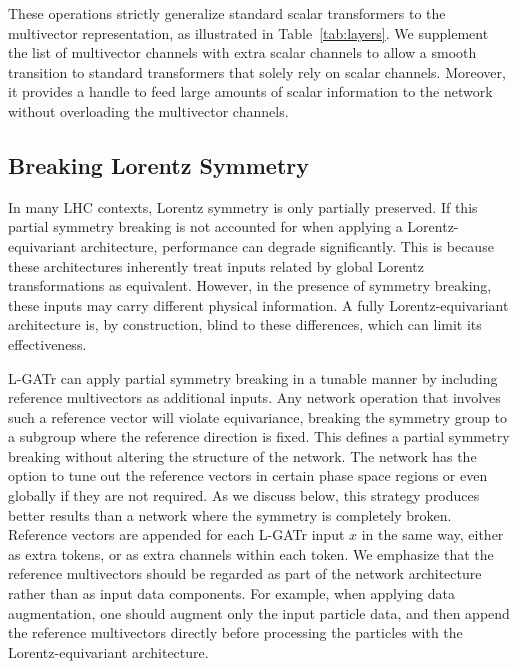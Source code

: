 \documentclass[submission, Phys]{SciPost}
\begin{document}
These operations strictly generalize standard scalar transformers to the multivector representation, as illustrated in Table~\ref{tab:layers}. We supplement the list of multivector channels with extra scalar channels to allow a smooth transition to standard transformers that solely rely on scalar channels. Moreover, it provides a handle to feed large amounts of scalar information to the network without overloading the multivector channels.

\subsection{Breaking Lorentz Symmetry}
\label{sec:symmetrybreaking}

In many LHC contexts, Lorentz symmetry is only partially preserved. If this partial symmetry breaking is not accounted for when applying a Lorentz-equivariant architecture, performance can degrade significantly. This is because these architectures inherently treat inputs related by global Lorentz transformations as equivalent. However, in the presence of symmetry breaking, these inputs may carry different physical information. A fully Lorentz-equivariant architecture is, by construction, blind to these differences, which can limit its effectiveness.

L-GATr can apply partial symmetry breaking in a tunable manner by including reference multivectors as additional inputs. 
Any network operation that involves such a reference vector will violate equivariance, breaking the symmetry group to a subgroup where the reference direction is fixed. This defines a partial symmetry breaking without altering the structure of the network. The network has the option to tune out the reference vectors in certain phase space regions or even globally if they are not required. As we discuss below, this strategy produces better results than a network where the symmetry is completely broken. Reference vectors are appended for each L-GATr input $x$ in the same way, either as extra tokens, or as extra channels within each token. We emphasize that the reference multivectors should be regarded as part of the network architecture rather than as input data components. For example, when applying data augmentation, one should augment only the input particle data, and then append the reference multivectors directly before processing the particles with the Lorentz-equivariant architecture.
\end{document}
